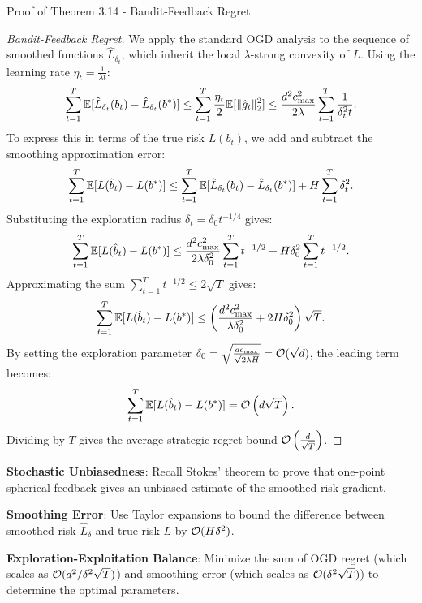 \begin{sourceblock}{Proof of Theorem 3.14 - Bandit-Feedback Regret}
\begin{proof}[Bandit-Feedback Regret]
We apply the standard OGD analysis to the sequence of smoothed functions $\hat{L}_{\delta_t}$, which inherit the local $\lambda$-strong convexity of $L$. Using the learning rate $\eta_t = \frac{1}{\lambda t}$:
\begin{equation}
    \sum_{t=1}^T \mathbb{E}[\hat{L}_{\delta_t}(b_t) - \hat{L}_{\delta_t}(b^*)] \le \sum_{t=1}^T \frac{\eta_t}{2}\mathbb{E}[\|\hat{g}_t\|_2^2] \le \frac{d^2 c_{\max}^2}{2\lambda}\sum_{t=1}^T \frac{1}{\delta_t^2 t}.
\end{equation}
To express this in terms of the true risk $L(b_t)$, we add and subtract the smoothing approximation error:
\begin{equation}
    \sum_{t=1}^T \mathbb{E}[L(\hat{b}_t) - L(b^*)] \le \sum_{t=1}^T \mathbb{E}[\hat{L}_{\delta_t}(b_t) - \hat{L}_{\delta_t}(b^*)] + H\sum_{t=1}^T \delta_t^2.
\end{equation}
Substituting the exploration radius $\delta_t = \delta_0 t^{-1/4}$ gives:
\begin{equation}
    \sum_{t=1}^T \mathbb{E}[L(\hat{b}_t) - L(b^*)] \le \frac{d^2 c_{\max}^2}{2\lambda \delta_0^2}\sum_{t=1}^T t^{-1/2} + H\delta_0^2 \sum_{t=1}^T t^{-1/2}.
\end{equation}
Approximating the sum $\sum_{t=1}^T t^{-1/2} \le 2\sqrt{T}$ gives:
\begin{equation}
    \sum_{t=1}^T \mathbb{E}[L(\hat{b}_t) - L(b^*)] \le \left( \frac{d^2 c_{\max}^2}{\lambda \delta_0^2} + 2H\delta_0^2 \right) \sqrt{T}.
\end{equation}
By setting the exploration parameter $\delta_0 = \sqrt{\frac{d c_{\max}}{\sqrt{2\lambda H}}} = \mathcal{O}(\sqrt{d})$, the leading term becomes:
\begin{equation}
    \sum_{t=1}^T \mathbb{E}[L(\hat{b}_t) - L(b^*)] = \mathcal{O}\left( d \sqrt{T} \right).
\end{equation}
Dividing by $T$ gives the average strategic regret bound $\mathcal{O}\left( \frac{d}{\sqrt{T}} \right)$.
\end{proof}
\end{sourceblock}

\begin{guideblock}
\item \textbf{Stochastic Unbiasedness}: Recall Stokes' theorem to prove that one-point spherical feedback gives an unbiased estimate of the smoothed risk gradient.
\item \textbf{Smoothing Error}: Use Taylor expansions to bound the difference between smoothed risk $\hat{L}_\delta$ and true risk $L$ by $\mathcal{O}(H\delta^2)$.
\item \textbf{Exploration-Exploitation Balance}: Minimize the sum of OGD regret (which scales as $\mathcal{O}(d^2/\delta^2\sqrt{T})$) and smoothing error (which scales as $\mathcal{O}(\delta^2\sqrt{T})$) to determine the optimal parameters.
\end{guideblock}

